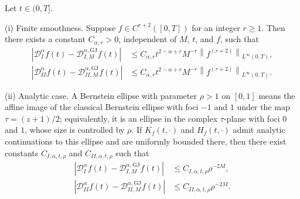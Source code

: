\documentclass[preprint,3p,times]{elsarticle}
\newcommand{\norm}[1]{\left\lVert #1\right\rVert}
\newcommand{\abs}[1]{\left\lvert #1\right\rvert}
\begin{document}
\begin{theorem}
\label{thm:GJ-convergence}
Let $t\in(0,T]$.

\smallskip
\noindent\textup{(i) Finite smoothness.} Suppose $f\in C^{r+2}([0,T])$ for an integer $r\ge1$. Then there exists a constant $C_{\alpha,r}>0$, independent of $M$, $t$, and $f$, such that
\begin{align}
\abs{\mathcal D_I^\alpha f(t)-\mathcal D_{I,M}^{\alpha,\mathrm{GJ}}f(t)}
&\le C_{\alpha,r}t^{2-\alpha+r}M^{-r}\norm{f^{(r+2)}}_{L^\infty(0,T)},\label{eqn:GJ-I-algebraic}\\
\abs{\mathcal D_{II}^\alpha f(t)-\mathcal D_{II,M}^{\alpha,\mathrm{GJ}}f(t)}
&\le C_{\alpha,r}t^{2-\alpha+r}M^{-r}\norm{f^{(r+2)}}_{L^\infty(0,T)}.\label{eqn:GJ-II-algebraic}
\end{align}

\smallskip
\noindent\textup{(ii) Analytic case.} A Bernstein ellipse with parameter $\rho>1$ on $[0,1]$ means the affine image of the classical Bernstein ellipse with foci $-1$ and $1$ under the map $\tau=(z+1)/2$; equivalently, it is an ellipse in the complex $\tau$-plane with foci $0$ and $1$, whose size is controlled by $\rho$. If $K_f(t,\cdot)$ and $H_f(t,\cdot)$ admit analytic continuations to this ellipse and are uniformly bounded there, then there exist constants $C_{I,\alpha,t,\rho}$ and $C_{II,\alpha,t,\rho}$ such that
\begin{align}
\abs{\mathcal D_I^\alpha f(t)-\mathcal D_{I,M}^{\alpha,\mathrm{GJ}}f(t)}
&\le C_{I,\alpha,t,\rho}\rho^{-2M},\label{eqn:GJ-I-spectral}\\
\abs{\mathcal D_{II}^\alpha f(t)-\mathcal D_{II,M}^{\alpha,\mathrm{GJ}}f(t)}
&\le C_{II,\alpha,t,\rho}\rho^{-2M}.\label{eqn:GJ-II-spectral}
\end{align}
\end{theorem}
\end{document}

